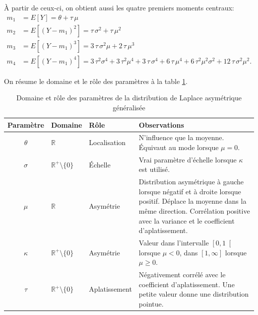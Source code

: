 À partir de ceux-ci, on obtient aussi les quatre premiers moments
centraux:
\begin{subequations}\label{eq:momentsGAL}
  \begin{align}
    m_1 &= E[Y] = \theta+\tau\,\mu \label{eq:moments1GAL}\\
    m_2 &= E[(Y-m_1)^2] = \tau\,\sigma^2+\tau\,\mu^2\label{eq:moments2GAL}\\
    m_3 &= E[(Y-m_1)^3] = 3\,\tau\,{\sigma}^{2}\mu+2\,\tau\,{\mu}^{3}\label{eq:moments3GAL}\\
    m_4 &= E[(Y-m_1)^4] =
    3\,{\tau}^{2}{\sigma}^{4}+3\,{\tau}^{2}{\mu}^{4}+3\,\tau\,{\sigma}^{4}+6\,\tau\,{\mu}^{4}+6\,{\tau}^{2}{\mu}^{2}{\sigma}^{2}+12\,\tau\,{\sigma}^{2}{\mu}^{2}.\label{eq:moments4GAL}
  \end{align}
\end{subequations}

On résume le domaine et le rôle des paramètres à la table
\ref{tab:roleparamGAL}.
\begin{table}[!ht]
  \centering
  \begin{tabular}{cp{1.75cm}p{2.5cm}p{6.25cm}}
    \hline
    \textbf{Paramètre} & \textbf{Domaine} & \textbf{Rôle} & \textbf{Observations} \\
    \hline
    $\theta$ & $\mathbb{R}$ & Localisation & N'influence que la moyenne. Équivaut au mode lorsque $\mu=0$. \\
    $\sigma$ & $\mathbb{R}^{+} \setminus \lbrace 0 \rbrace$ & Échelle & Vrai paramètre d'échelle lorsque $\kappa$ est utilisé. \\
    $\mu$ & $\mathbb{R}$ & Asymétrie & Distribution asymétrique à gauche lorsque négatif et à droite lorsque positif. Déplace la moyenne dans la même direction. Corrélation positive avec la variance et le coefficient d'aplatissement.\\
    $\kappa$ & $\mathbb{R}^{+} \setminus \lbrace 0 \rbrace$ & Asymétrie & Valeur dans l'intervalle $\left[0,1\right[$ lorsque $\mu<0$, dans $\left[1,\infty \right]$ lorsque $\mu \geq0$.  \\
    $\tau$ & $\mathbb{R}^{+} \setminus \lbrace 0 \rbrace$ & Aplatissement & Négativement corrélé avec le coefficient d'aplatissement. Une petite valeur donne une distribution pointue. \\
    \hline
  \end{tabular}
  \caption{Domaine et rôle des paramètres de la distribution de Laplace asymétrique généralisée}
  \label{tab:roleparamGAL}
\end{table}

